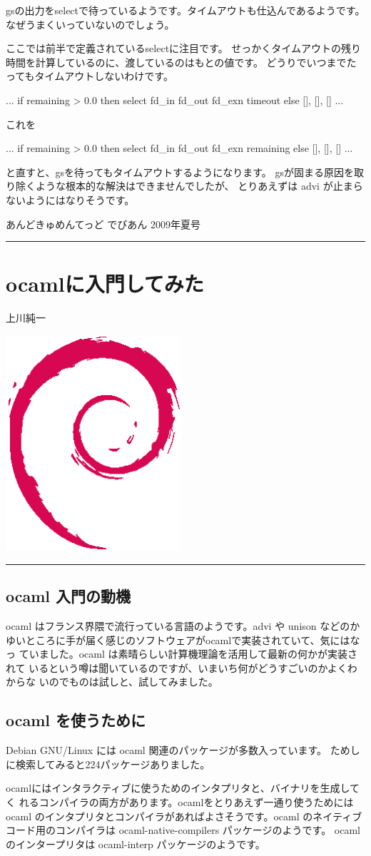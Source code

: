 \documentclass[mingoth,a4paper]{jsarticle}
\renewcommand{\dancersection}[2]{%
\newpage
あんどきゅめんてっど でびあん 2009年夏号
%
\vspace{0.1mm}\\
{\color{dancerlightblue}\rule{\hsize}{2mm}}

%
%
\begin{minipage}[t]{0.6\hsize}
\color{dancerdarkblue}
\vspace{1cm}
\section{#1}
\hfill{}#2\\
\end{minipage}
\begin{minipage}[t]{0.4\hsize}
\vspace{-2cm}
\hfill{}\includegraphics[height=8cm]{image200502/openlogo-nd.eps}\\
\vspace{-5cm}
\end{minipage}
%
%
{\color{dancerdarkblue}\rule{0.74\hsize}{2mm}}
%
\vspace{2cm}
}
\begin{document}
gsの出力をselectで待っているようです。タイムアウトも仕込んであるようです。
なぜうまくいっていないのでしょう。

ここでは前半で定義されているselectに注目です。
せっかくタイムアウトの残り時間を計算しているのに、渡しているのはもとの値です。
どうりでいつまでたってもタイムアウトしないわけです。

\begin{commandline}
...
if remaining > 0.0 then select fd_in fd_out fd_exn timeout else [], [], []
...
\end{commandline}

これを
\begin{commandline}
...
if remaining > 0.0 then select fd_in fd_out fd_exn remaining else [], [], []
...
\end{commandline}

と直すと、gsを待ってもタイムアウトするようになります。
gsが固まる原因を取り除くような根本的な解決はできませんでしたが、
とりあえずは advi が止まらないようにはなりそうです。

\dancersection{ocamlに入門してみた}{上川純一}

\subsection{ocaml 入門の動機}

ocaml はフランス界隈で流行っている言語のようです。advi や unison などのか
ゆいところに手が届く感じのソフトウェアがocamlで実装されていて、気にはなっ
ていました。ocaml は素晴らしい計算機理論を活用して最新の何かが実装されて
いるという噂は聞いているのですが、いまいち何がどうすごいのかよくわからな
いのでものは試しと、試してみました。

\subsection{ocaml を使うために}

Debian GNU/Linux には ocaml 関連のパッケージが多数入っています。
ためしに検索してみると224パッケージありました。

ocamlにはインタラクティブに使うためのインタプリタと、バイナリを生成してく
れるコンパイラの両方があります。ocamlをとりあえず一通り使うためには
ocaml のインタプリタとコンパイラがあればよさそうです。ocaml のネイティブ
コード用のコンパイラは ocaml-native-compilers パッケージのようです。
ocaml のインタープリタは ocaml-interp パッケージのようです。
\end{document}
